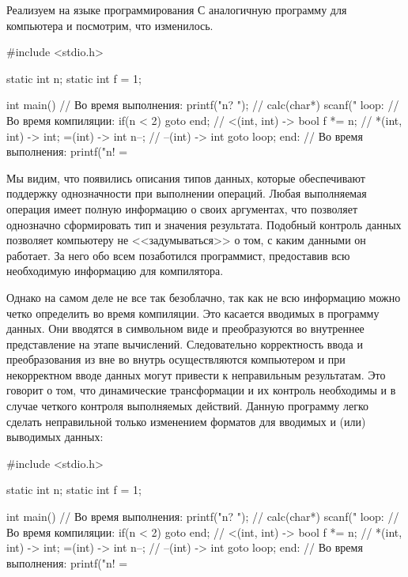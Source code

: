 Реализуем на языке программирования С аналогичную программу для компьютера и посмотрим, что изменилось.

\begin{ffcode}
#include <stdio.h>

static int n;
static int f = 1;

int main() {
  // Во время выполнения:
  printf("n? ");           // calc(char*)
  scanf("%
loop:
  // Во время компиляции:
  if(n < 2) goto end;      // <(int, int) -> bool
  f *= n;                  // *(int, int) -> int; =(int) -> int
  n--;                     // --(int) -> int
  goto loop;
end:
  // Во время выполнения:
  printf("n! = %
}
\end{ffcode}
Мы видим, что появились описания типов данных, которые обеспечивают поддержку однозначности при выполнении операций. Любая выполняемая операция имеет полную информацию о своих аргументах, что позволяет однозначно сформировать тип и значения результата. Подобный контроль данных позволяет компьютеру не <<задумываться>> о том, с каким данными он работает. За него обо всем позаботился программист, предоставив всю необходимую информацию для компилятора.

Однако на самом деле не все так безоблачно, так как не всю информацию можно четко определить во время компиляции. Это касается вводимых в программу данных. Они вводятся в символьном виде и преобразуются во внутреннее представление на этапе вычислений. Следовательно корректность ввода и преобразования из вне во внутрь осуществляются компьютером и при некорректном вводе данных могут привести к неправильным результатам. Это говорит о том, что динамические трансформации и их контроль необходимы и в случае четкого контроля выполняемых действий. Данную программу легко сделать неправильной только изменением форматов для вводимых и (или) выводимых данных:

\begin{ffcode}
#include <stdio.h>

static int n;
static int f = 1;

int main() {
  // Во время выполнения:
  printf("n? ");            // calc(char*)
  scanf("%
loop:
  // Во время компиляции:
  if(n < 2) goto end;       // <(int, int) -> bool
  f *= n;                   // *(int, int) -> int; =(int) -> int
  n--;                      // --(int) -> int
  goto loop;
end:
  // Во время выполнения:
  printf("n! = %
}
\end{ffcode}

